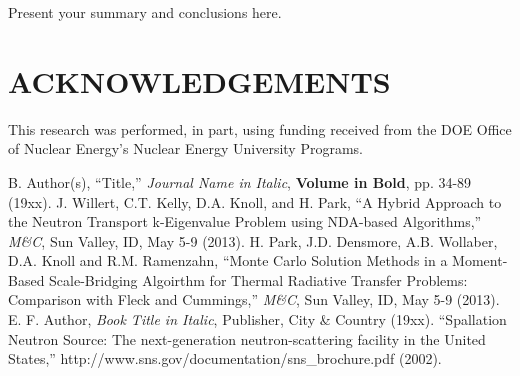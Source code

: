 \documentclass{mc2013}
\begin{document}

Present your summary and conclusions here.


\section*{ACKNOWLEDGEMENTS}

This research was performed, in part, using funding received from the DOE Office of Nuclear
Energy's Nuclear Energy University Programs.


\setlength{\baselineskip}{12pt}
\begin{thebibliography}{300}
 B. Author(s), ``Title,'' {\it Journal Name in Italic}, 
          {\bf Volume in Bold}, pp. 34-89 (19xx).
 J. Willert, C.T. Kelly, D.A. Knoll, and H. Park,
         ``A Hybrid Approach to the Neutron Transport k-Eigenvalue Problem using
         NDA-based Algorithms,'' {\it M\&C}, Sun Valley, ID, May 5-9 (2013).
 H. Park, J.D. Densmore, A.B. Wollaber, D.A. Knoll and  R.M. Ramenzahn,
                ``Monte Carlo Solution Methods in a Moment-Based Scale-Bridging
                Algoirthm for Thermal Radiative Transfer Problems: Comparison with
                Fleck and Cummings,'' {\it M\&C}, Sun Valley, ID, May 5-9 (2013).
 E. F. Author, {\it Book Title in Italic}, Publisher, City \&
          Country (19xx). 
 ``Spallation Neutron Source: The next-generation 
          neutron-scattering facility in the United States,'' 
          http://www.sns.gov/documentation/sns\_brochure.pdf (2002).
\end{thebibliography}
\end{document}
